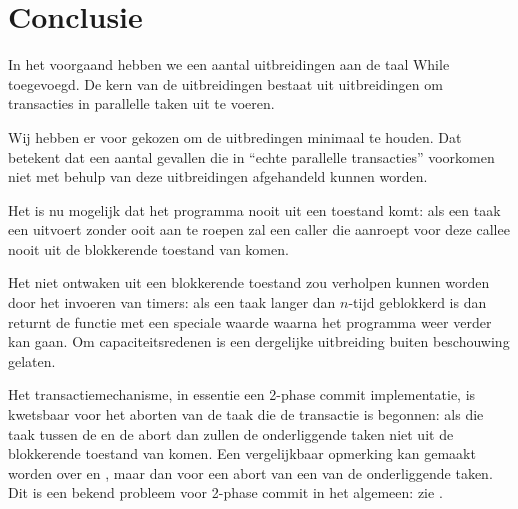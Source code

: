 \section*{Conclusie}


In het voorgaand hebben we een aantal uitbreidingen aan de taal While toegevoegd. De kern van de uitbreidingen bestaat
uit uitbreidingen om transacties in parallelle taken uit te voeren.

Wij hebben er voor gekozen om de uitbredingen minimaal te houden. Dat betekent dat een aantal gevallen die in ``echte
parallelle transacties'' voorkomen niet met behulp van deze uitbreidingen afgehandeld kunnen worden.

Het is nu mogelijk dat het programma nooit uit een  toestand komt: als een taak een  
 uitvoert zonder ooit  aan te roepen zal een caller die  aanroept voor deze callee
nooit uit de blokkerende toestand van  komen.

Het niet ontwaken uit een blokkerende toestand zou verholpen kunnen worden door het invoeren van timers: als een taak
langer dan $n$-tijd geblokkerd is dan returnt de functie met een speciale waarde waarna het programma weer verder kan
gaan. Om capaciteitsredenen is een dergelijke uitbreiding buiten beschouwing gelaten.

Het transactiemechanisme, in essentie een 2-phase commit implementatie, is kwetsbaar voor het aborten van de
taak die de transactie is begonnen: als die taak tussen de  en de  abort dan
zullen de onderliggende taken niet uit de blokkerende toestand van  komen. Een vergelijkbaar opmerking
kan gemaakt worden over  en , maar dan voor een
abort van een van de onderliggende taken. Dit is een bekend probleem voor 2-phase commit in het algemeen: zie
\cite{SkeenStonebraker}.



